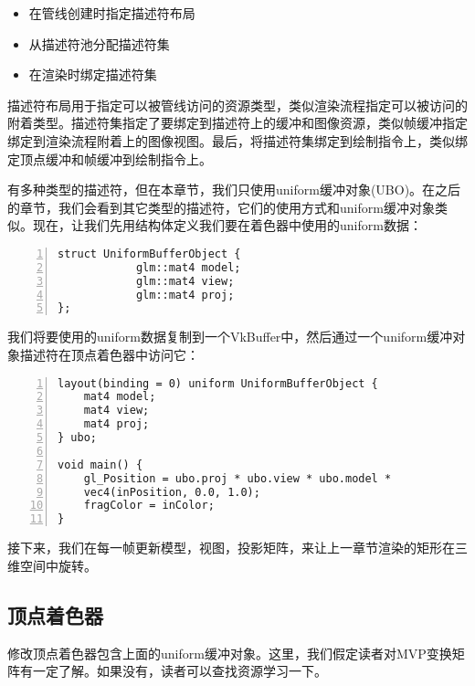 \documentclass{ctexart}
\begin{document}
\begin{itemize}
	\item 在管线创建时指定描述符布局
	\item 从描述符池分配描述符集
	\item 在渲染时绑定描述符集
\end{itemize}

描述符布局用于指定可以被管线访问的资源类型，类似渲染流程指定可以被访问的附着类型。描述符集指定了要绑定到描述符上的缓冲和图像资源，类似帧缓冲指定绑定到渲染流程附着上的图像视图。最后，将描述符集绑定到绘制指令上，类似绑定顶点缓冲和帧缓冲到绘制指令上。

有多种类型的描述符，但在本章节，我们只使用uniform缓冲对象(UBO)。在之后的章节，我们会看到其它类型的描述符，它们的使用方式和uniform缓冲对象类似。现在，让我们先用结构体定义我们要在着色器中使用的uniform数据：

\begin{lstlisting}[language={[ANSI]C},keywordstyle=\color{blue!70},commentstyle=\color{red!50!green!50!blue!50},frame=shadowbox, rulesepcolor=\color{red!20!green!20!blue!20},basicstyle=\small,numbers=left, numberstyle=\tiny,breaklines=true]
struct UniformBufferObject {
			glm::mat4 model;
			glm::mat4 view;
			glm::mat4 proj;
};
\end{lstlisting}

我们将要使用的uniform数据复制到一个VkBuffer中，然后通过一个uniform缓冲对象描述符在顶点着色器中访问它：

\begin{lstlisting}[language={[ANSI]C},keywordstyle=\color{blue!70},commentstyle=\color{red!50!green!50!blue!50},frame=shadowbox, rulesepcolor=\color{red!20!green!20!blue!20},basicstyle=\small,numbers=left, numberstyle=\tiny,breaklines=true]
layout(binding = 0) uniform UniformBufferObject {
	mat4 model;
	mat4 view;
	mat4 proj;
} ubo;

void main() {
	gl_Position = ubo.proj * ubo.view * ubo.model *
	vec4(inPosition, 0.0, 1.0);
	fragColor = inColor;
}
\end{lstlisting}

接下来，我们在每一帧更新模型，视图，投影矩阵，来让上一章节渲染的矩形在三维空间中旋转。

\subsection{顶点着色器}

修改顶点着色器包含上面的uniform缓冲对象。这里，我们假定读者对MVP变换矩阵有一定了解。如果没有，读者可以查找资源学习一下。
\end{document}
